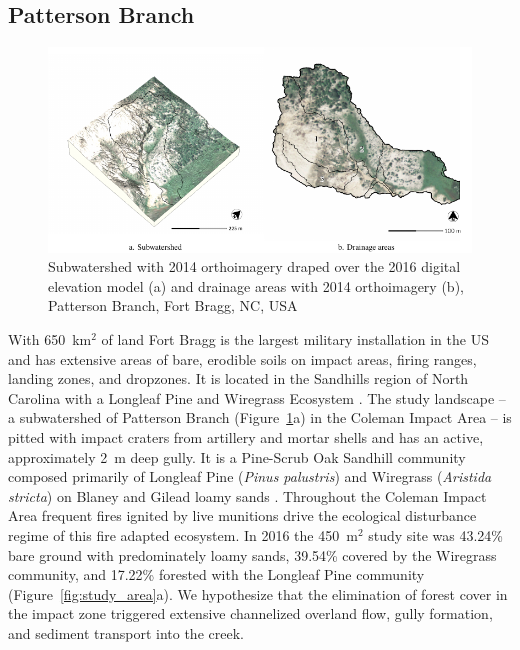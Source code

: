 \documentclass[gmd, manuscript]{copernicus}
\begin{document}
\subsection{Patterson Branch}

\begin{figure}
\center
\includegraphics[width=\textwidth,height=0.95\textheight,keepaspectratio]{figures/watershed.pdf}
\caption{Subwatershed with 2014 orthoimagery
draped over the 2016 digital elevation model (a)
and drainage areas with 2014 orthoimagery (b), Patterson Branch, Fort Bragg, NC, USA}
\label{fig:watershed}
\end{figure}

With 650~\unit{km}$^{2}$ of land
Fort Bragg is the largest military installation in the US
and has extensive areas of bare, erodible soils
on impact areas, firing ranges, landing zones, and dropzones. 
It is located in the Sandhills region of North Carolina 
with a Longleaf Pine and Wiregrass Ecosystem \citep{Sorrie2006}.
%
The study landscape 
-- a subwatershed of Patterson Branch (Figure~\ref{fig:watershed}a) 
in the Coleman Impact Area --
is pitted with impact craters from artillery and mortar shells
and has an active, approximately 2~\unit{m} deep gully. 
%
It is a Pine-Scrub Oak Sandhill community
composed primarily of Longleaf Pine (\emph{Pinus palustris})
and Wiregrass (\emph{Aristida stricta})
on Blaney and Gilead loamy sands 
\citep{Sorrie2004}. 
%
Throughout the Coleman Impact Area
frequent fires ignited by live munitions
drive the ecological disturbance regime
of this fire adapted ecosystem.
%
In 2016 the  450~\unit{m}$^{2}$ study site was
43.24\% bare ground with predominately loamy sands,
39.54\% covered by the Wiregrass community, and
17.22\% forested with the Longleaf Pine community 
(Figure~\ref{fig:study_area}a). 
%
We hypothesize that the elimination of forest cover
in the impact zone
triggered extensive channelized overland flow,
gully formation, and sediment transport into the creek. 
\end{document}
